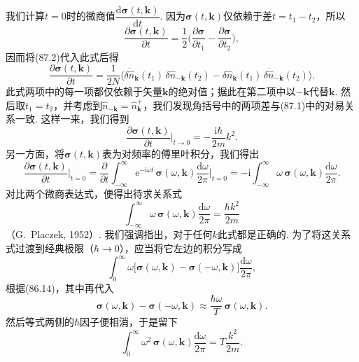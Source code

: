 我们计算$t=0$时的微商值$\dfrac{\mathrm{d}\bm{\sigma}(t,\bm{k})}{\mathrm{d}t}$. 因为$\bm{\sigma}(t,\bm{k})$仅依赖于差$t=t_{1}-t_{2}$，所以
\begin{equation*}
\frac{\partial\bm{\sigma}(t,\bm{k})}{\partial t}=\frac{1}{2}\biggl(\frac{\partial\bm{\sigma}}{\partial t_{1}}-\frac{\partial\bm{\sigma}}{\partial t_{2}}\biggr),
\end{equation*}
因而将(87.2)代入此式后得
\begin{equation*}
\frac{\partial\bm{\sigma}(t,\bm{k})}{\partial t}=\frac{1}{2N}\bigl\langle\delta\dot{\hat{n}}_{\bm{k}}(t_{1})\,\delta\hat{n}_{-\bm{k}}(t_{2})-\delta\hat{n}_{\bm{k}}(t_{1})\,\delta\dot{\hat{n}}_{-\bm{k}}(t_{2})\bigr\rangle.
\end{equation*}
此式两项中的每一项都仅依赖于矢量$\bm{k}$的绝对值；据此在第二项中以$-\bm{k}$代替$\bm{k}$. 然后取$t_{1}=t_{2}$，并考虑到$\hat{n}_{-\bm{k}}=\hat{n}^{+}_{\bm{k}}$，我们发现角括号中的两项差与(87.1)中的对易关系一致. 这样一来，我们得到
\begin{equation*}
\frac{\partial\bm{\sigma}(t,\bm{k})}{\partial t}\bigg|_{t\to0}=-\frac{\mathrm{i}\hbar}{2m}k^{2}.
\end{equation*}
另一方面，将$\bm{\sigma}(t,\bm{k})$表为对频率的傅里叶积分，我们得出
\begin{equation*}
\frac{\partial\bm{\sigma}(t,\bm{k})}{\partial t}\bigg|_{t=0}=\frac{\partial}{\partial t}\int_{-\infty}^{\infty}\mathrm{e}^{-\mathrm{i}\omega t}\,\bm{\sigma}(\omega,\bm{k})\frac{\mathrm{d}\omega}{2\pi}\bigg|_{t=0}=-\mathrm{i}\int_{-\infty}^{\infty}\omega\,\bm{\sigma}(\omega,\bm{k})\frac{\mathrm{d}\omega}{2\pi}.
\end{equation*}
对比两个微商表达式，便得出待求关系式
\begin{equation}
\int_{-\infty}^{\infty}\omega\,\bm{\sigma}(\omega,\bm{k})\frac{\mathrm{d}\omega}{2\pi}=\frac{\hbar k^{2}}{2m}
\end{equation}
（G.~Placzek, 1952）. 我们强调指出，对于任何$k$此式都是正确的. 为了将这关系式过渡到经典极限（$\hbar\to0$），应当将它左边的积分写成
\begin{equation*}
\int_{0}^{\infty}\omega\bigl[\bm{\sigma}(\omega,\bm{k})-\bm{\sigma}(-\omega,\bm{k})\bigr]\frac{\mathrm{d}\omega}{2\pi},
\end{equation*}
根据(86.14)，其中再代入
\begin{equation*}
\bm{\sigma}(\omega,\bm{k})-\bm{\sigma}(-\omega,\bm{k})\approx\frac{\hbar\omega}{T}\,\bm{\sigma}(\omega,\bm{k}).
\end{equation*}
然后等式两侧的$\hbar$因子便相消，于是留下
\begin{equation*}
\int_{0}^{\infty}\omega^{2}\,\bm{\sigma}(\omega,\bm{k})\frac{\mathrm{d}\omega}{2\pi}=T\frac{k^{2}}{2m}.
\end{equation*}

